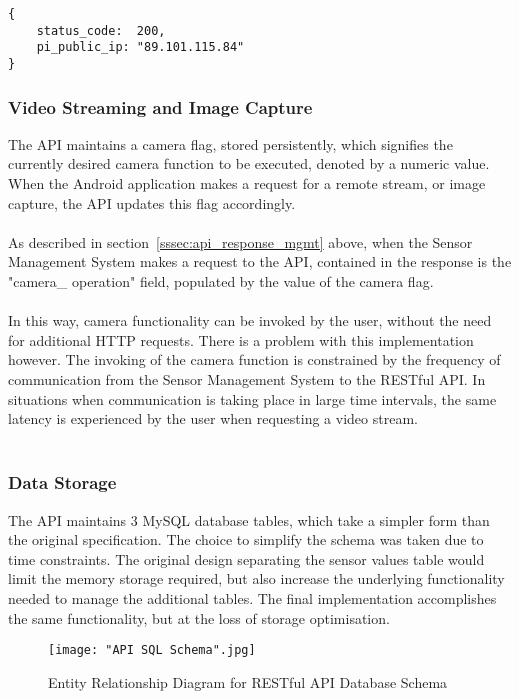 \documentclass{article}
\begin{document}
\begin{lstlisting}[caption={JSON API response to Android application},label={lst:json_api_response_android}]
{
	status_code:  200,
	pi_public_ip: "89.101.115.84"
}
\end{lstlisting}

\subsubsection{Video Streaming and Image Capture}
\label{sssec:api_video_and_image}
The API maintains a camera flag, stored persistently, which signifies the currently desired camera function to be executed, denoted by a numeric value. When the Android application makes a request for a remote stream, or image capture, the API updates this flag accordingly. \\\\
As described in section~\ref{sssec:api_response_mgmt} above, when the Sensor Management System makes a request to the API, contained in the response is the "camera\_ operation" field, populated by the value of the camera flag. \\\\
In this way, camera functionality can be invoked by the user, without the need for additional HTTP requests. There is a problem with this implementation however. The invoking of the camera function is constrained by the frequency of communication from the Sensor Management System to the RESTful API. In situations when communication is taking place in large time intervals, the same latency is experienced by the user when requesting a video stream. \\\\


\newpage

\subsubsection{Data Storage}
The API maintains 3 MySQL database tables, which take a simpler form than the original specification. The choice to simplify the schema was taken due to time constraints. The original design separating the sensor values table would limit the memory storage required, but also increase the underlying functionality needed to manage the additional tables. The final implementation accomplishes the same functionality, but at the loss of storage optimisation. \
\begin{figure}[H]
\centering
\texttt{[image: "API SQL Schema".jpg]}
\caption{Entity Relationship Diagram for RESTful API Database Schema}
\label{fig:api_schema}
\end{figure}
\end{document}
